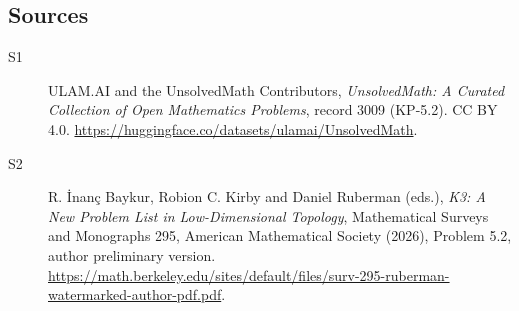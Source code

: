 \documentclass[11pt]{article}
\begin{document}
\subsection{Sources}
\begin{description}
\item[\hypertarget{source:3009:1}{S1}] ULAM.AI and the UnsolvedMath Contributors, \emph{UnsolvedMath: A Curated Collection of Open Mathematics Problems}, record 3009 (KP-5.2). CC BY 4.0. \url{https://huggingface.co/datasets/ulamai/UnsolvedMath}.
\item[\hypertarget{source:3009:2}{S2}] R. İnanç Baykur, Robion C. Kirby and Daniel Ruberman (eds.), \emph{K3: A New Problem List in Low-Dimensional Topology}, Mathematical Surveys and Monographs 295, American Mathematical Society (2026), Problem 5.2, author preliminary version. \url{https://math.berkeley.edu/sites/default/files/surv-295-ruberman-watermarked-author-pdf.pdf}.
\end{description}
\label{end:3009}
\end{document}
